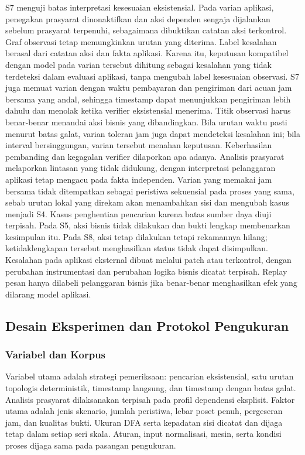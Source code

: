 S7 menguji batas interpretasi kesesuaian eksistensial. Pada varian aplikasi, penegakan prasyarat dinonaktifkan dan aksi dependen sengaja dijalankan sebelum prasyarat terpenuhi, sebagaimana dibuktikan catatan aksi terkontrol. Graf observasi tetap memungkinkan urutan yang diterima. Label kesalahan berasal dari catatan aksi dan fakta aplikasi. Karena itu, keputusan kompatibel dengan model pada varian tersebut dihitung sebagai kesalahan yang tidak terdeteksi dalam evaluasi aplikasi, tanpa mengubah label kesesuaian observasi. S7 juga memuat varian dengan waktu pembayaran dan pengiriman dari acuan jam bersama yang andal, sehingga timestamp dapat menunjukkan pengiriman lebih dahulu dan menolak ketika verifier eksistensial menerima. Titik observasi harus benar-benar menandai aksi bisnis yang dibandingkan. Bila urutan waktu pasti menurut batas galat, varian toleran jam juga dapat mendeteksi kesalahan ini; bila interval bersinggungan, varian tersebut menahan keputusan. Keberhasilan pembanding dan kegagalan verifier dilaporkan apa adanya. Analisis prasyarat melaporkan lintasan yang tidak didukung, dengan interpretasi pelanggaran aplikasi tetap mengacu pada fakta independen. Varian yang memakai jam bersama tidak ditempatkan sebagai peristiwa sekuensial pada proses yang sama, sebab urutan lokal yang direkam akan menambahkan sisi dan mengubah kasus menjadi S4. Kasus penghentian pencarian karena batas sumber daya diuji terpisah. Pada S5, aksi bisnis tidak dilakukan dan bukti lengkap membenarkan kesimpulan itu. Pada S8, aksi tetap dilakukan tetapi rekamannya hilang; ketidaklengkapan tersebut menghasilkan status tidak dapat disimpulkan. Kesalahan pada aplikasi eksternal dibuat melalui patch atau  terkontrol, dengan perubahan instrumentasi dan perubahan logika bisnis dicatat terpisah. Replay pesan hanya dilabeli pelanggaran bisnis jika benar-benar menghasilkan efek yang dilarang model aplikasi.

\subsection{Desain Eksperimen dan Protokol Pengukuran}
\subsubsection{Variabel dan Korpus}
Variabel utama adalah strategi pemeriksaan: pencarian eksistensial, satu urutan topologis deterministik, timestamp langsung, dan timestamp dengan batas galat. Analisis prasyarat dilaksanakan terpisah pada profil dependensi eksplisit. Faktor utama adalah jenis skenario, jumlah peristiwa, lebar poset penuh, pergeseran jam, dan kualitas bukti. Ukuran DFA serta kepadatan sisi dicatat dan dijaga tetap dalam setiap seri skala. Aturan, input normalisasi, mesin, serta kondisi proses dijaga sama pada pasangan pengukuran.

